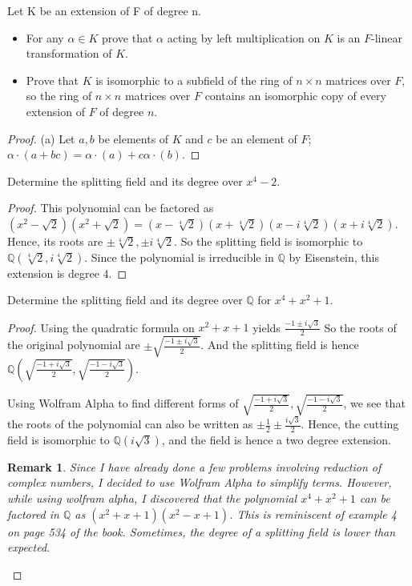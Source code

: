 \documentclass[10pt]{article}
\newcommand{\Q}{\mathbb{Q}}
\newenvironment{problem}[2][Problem]{\begin{trivlist}
		\item[\hskip \labelsep {\bfseries #1}\hskip \labelsep {\bfseries #2.}]}{\end{trivlist}}
\newtheorem{rem}{Remark}
\begin{document}
	\begin{problem}{2.19}
		Let K be an extension of F of degree n.
		\begin{itemize}
			\item[\textbf{(a)}] For any $\alpha \in K$ prove that $\alpha$ acting by left multiplication on $K$ is an $F$-linear transformation of $K$.
			\item[\textbf{(b)}] Prove that $K$ is isomorphic to a subfield of the ring of $n \times n$ matrices over $F$, so the ring of $n \times n$ matrices over $F$ contains an isomorphic copy of every extension of $F$
			of degree $n$.
		\end{itemize}
		\begin{proof}{(a)}
			Let $a, b$ be elements of $K$ and $c$ be an element of $F$; $\alpha \cdot (a + bc) = \alpha\cdot(a) + c \alpha \cdot (b)$.
		\end{proof}
	\end{problem}
	
	\begin{problem}{4.1}
		Determine the splitting field and its degree over $x^4 - 2$.
		\begin{proof}
			This polynomial can be factored as $(x^2-\sqrt{2})(x^2+\sqrt{2}) = (x - \sqrt[4]{2})(x+\sqrt[4]{2})(x-i\sqrt[4]{2})(x+i\sqrt[4]{2})$. Hence, its roots are $\pm \sqrt[4]{2}, \pm i\sqrt[4]{2}$. So the splitting field is isomorphic to $\Q(\sqrt[4]{2}, i\sqrt[4]{2})$.
			Since the polynomial is irreducible in $\Q$ by Eisenstein, this extension is degree $4$.
		\end{proof}
	\end{problem}
	
	\begin{problem}{4.3}
		Determine the splitting field and its degree over $\Q$ for $x^4 + x^2 + 1$.
		\begin{proof}
			Using the quadratic formula on $x^2 + x + 1$ yields $\frac{-1 \pm i\sqrt{3}}{2}$ So the roots of the original polynomial are $\pm\sqrt{\frac{-1 \pm i\sqrt{3}}{2}}$. And the splitting field is hence $\Q(\sqrt{\frac{-1 + i\sqrt{3}}{2}}, \sqrt{\frac{-1 - i\sqrt{3}}{2}})$.
			
			Using Wolfram Alpha to find different forms of $\sqrt{\frac{-1 + i\sqrt{3}}{2}}, \sqrt{\frac{-1 - i\sqrt{3}}{2}}$, we see that the roots of the polynomial can also be written as $\pm \frac{1}{2} \pm \frac{i\sqrt{3}}{2}$. Hence, the cutting field is isomorphic to $\Q(i\sqrt{3})$, and the field is hence a two degree extension.
			
			\begin{rem}
				Since I have already done a few problems involving reduction of complex numbers, I decided to use Wolfram Alpha to simplify terms. However, while using wolfram alpha, I discovered that the polynomial $x^4 + x^2 + 1$ can be factored in $\Q$ as $(x^2+x+1)(x^2-x+1)$. This is reminiscent of example 4 on page 534 of the book. Sometimes, the degree of a splitting field is lower than expected.
			\end{rem}
		\end{proof}
	\end{problem}
	
\end{document}
